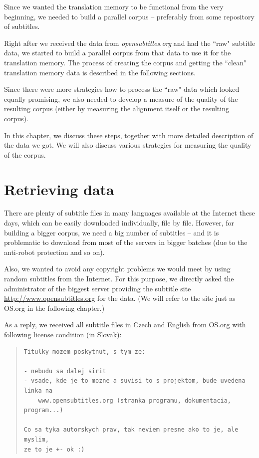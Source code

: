 \label{chap:building_corpus}

Since we wanted the translation memory to be functional from the very beginning, we needed to build a parallel corpus -- preferably from some repository of subtitles. 

Right after we received the data from \emph{opensubtitles.org} and had the ``raw" subtitle data, we started to build a parallel corpus from that data to use it for the translation memory. The process of creating the corpus and getting the ``clean" translation memory data is described in the following sections.

Since there were more strategies how to process the ``raw" data which looked equally promising, we also needed to develop a measure of the quality of the resulting corpus (either by measuring the alignment itself or the resulting corpus).

In this chapter, we discuss these steps, together with more detailed description of the data we got. We will also discuss various strategies for measuring the quality of the corpus.

\section{Retrieving data}

There are plenty of subtitle files in many languages available at the Internet these days, which can be easily downloaded individually, file by file. However, for building a bigger corpus, we need a big number of subtitles -- and it is problematic to download from most of the servers in bigger batches (due to the anti-robot protection and so on). 

Also, we wanted to avoid any copyright problems we would meet by using random subtitles from the Internet. For this purpose, we directly asked the administrator of the biggest server providing the subtitle site \url{http://www.opensubtitles.org} for the data. (We will refer to the site just as OS.org in the following chapter.)

As a reply, we received all subtitle files in Czech and English from OS.org with following license condition (in Slovak):

\begin{quote}
\begin{verbatim}
Titulky mozem poskytnut, s tym ze:

- nebudu sa dalej sirit
- vsade, kde je to mozne a suvisi to s projektom, bude uvedena linka na
    www.opensubtitles.org (stranka programu, dokumentacia, program...)

Co sa tyka autorskych prav, tak neviem presne ako to je, ale myslim,
ze to je +- ok :)
\end{verbatim}
\end{quote}


